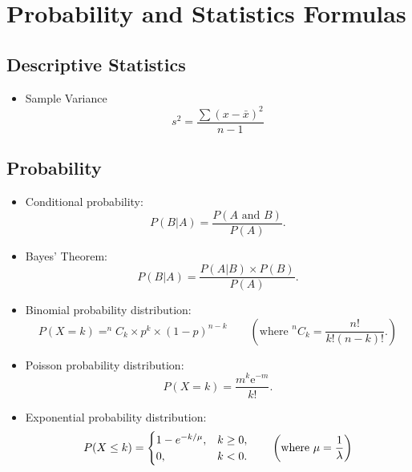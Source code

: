 \documentclass[a4paper,12pt]{article}
\begin{document}
\section*{Probability and Statistics Formulas}
\subsection*{Descriptive Statistics}
\begin{itemize}
	\item Sample Variance
	\begin{equation*}
	s^2 = \frac{\sum (x-\bar{x})^2}{n-1}
	\end{equation*}
\end{itemize}
\subsection*{Probability}
\begin{itemize}
	
	\item Conditional probability:
	\begin{equation*}
	P(B|A)=\frac{P\left( A\text{ and }B\right) }{P\left( A\right) }.
	\end{equation*}
	
	
	\item Bayes' Theorem:
	\begin{equation*}
	P(B|A)=\frac{P\left(A|B\right) \times P(B) }{P\left( A\right) }.
	\end{equation*}
	
	
	
	
	
	\item Binomial probability distribution:
	\begin{equation*}
		P(X = k) = ^{n}C_{k} \times p^{k} \times \left( 1-p\right) ^{n-k}\qquad \left( \text{where  }
		^{n}C_{k} =\frac{n!}{k!\left(n-k\right) !}. \right)
	\end{equation*}
	
	\item Poisson probability distribution:
	\begin{equation*}
		P(X = k) =\frac{m^{k}\mathrm{e}^{-m}}{k!}.
	\end{equation*}
	
	\item Exponential probability distribution:
	\begin{equation*}
		P(X \leq k) = \begin{cases}
			1-e^{- k/\mu}, & k \ge 0, \\
			0, & k < 0.
		\end{cases}\qquad \left( \text{where  }
		\mu = {1\over \lambda}\right)
	\end{equation*}
\end{itemize}
\end{document}
